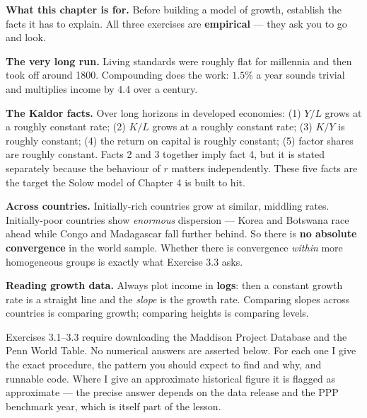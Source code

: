 \documentclass[12pt, letterpaper]{article}
\begin{document}
\begin{tcolorbox}[theorybox,title={Chapter 3 Overview}]
\textbf{What this chapter is for.} Before building a model of growth, establish the facts it
has to explain. All three exercises are \textbf{empirical} --- they ask you to go and look.

\medskip
\textbf{The very long run.} Living standards were roughly flat for millennia and then took
off around 1800. Compounding does the work: $1.5\%$ a year sounds trivial and multiplies
income by $4.4$ over a century.

\medskip
\textbf{The Kaldor facts.} Over long horizons in developed economies: (1) $Y/L$ grows at a
roughly constant rate; (2) $K/L$ grows at a roughly constant rate; (3) $K/Y$ is roughly
constant; (4) the return on capital is roughly constant; (5) factor shares are roughly
constant. Facts 2 and 3 together imply fact 4, but it is stated separately because the
behaviour of $r$ matters independently. These five facts are the target the Solow model of
Chapter 4 is built to hit.

\medskip
\textbf{Across countries.} Initially-rich countries grow at similar, middling rates.
Initially-poor countries show \emph{enormous} dispersion --- Korea and Botswana race ahead
while Congo and Madagascar fall further behind. So there is \textbf{no absolute convergence}
in the world sample. Whether there is convergence \emph{within} more homogeneous groups is
exactly what Exercise 3.3 asks.

\medskip
\textbf{Reading growth data.} Always plot income in \textbf{logs}: then a constant growth
rate is a straight line and the \emph{slope} is the growth rate. Comparing slopes across
countries is comparing growth; comparing heights is comparing levels.
\end{tcolorbox}

\begin{tcolorbox}[databox,title={All three exercises in this chapter are data exercises}]
Exercises 3.1--3.3 require downloading the Maddison Project Database and the Penn World
Table. No numerical answers are asserted below. For each one I give the exact procedure, the
pattern you should expect to find and why, and runnable code. Where I give an approximate
historical figure it is flagged as approximate --- the precise answer depends on the data
release and the PPP benchmark year, which is itself part of the lesson.
\end{tcolorbox}

\end{document}
